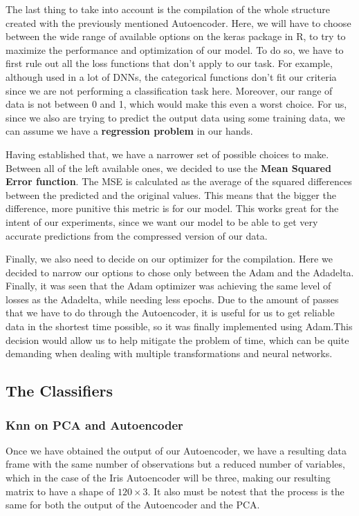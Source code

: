 The last thing to take into account is the compilation of the whole structure created with the previously mentioned Autoencoder. Here, we will have to choose between the wide range of available options on the keras package in R, to try to maximize the performance and optimization of our model. To do so, we have to first rule out all the loss functions that don't apply to our task. For example, although used in a lot of DNNs, the categorical functions don't fit our criteria since we are not performing a classification task here. Moreover, our range of data is not between 0 and 1, which would make this even a worst choice. For us, since we also are trying to predict the output data using some training data, we can assume we have a \textbf{regression problem} in our hands.\par

Having established that, we have a narrower set of possible choices to make. Between all of the left available ones, we decided to use the \textbf{Mean Squared Error function}. The MSE is calculated as the average of the squared differences between the predicted and the original values. This means that the bigger the difference,  more punitive this metric is for our model. This works great for the intent of our experiments, since we want our model to be able to get very accurate predictions from the compressed version of our data. \par

Finally, we also need to decide on our optimizer for the compilation. Here we decided to narrow our options to chose only between the Adam and the Adadelta. Finally, it was seen that the Adam optimizer was achieving the same level of losses as the Adadelta, while needing less epochs. Due to the amount of passes that we have to do through the Autoencoder, it is useful for us to get reliable data in the shortest time possible, so it was finally implemented using Adam.This decision would allow us to help mitigate the problem of time, which can be quite demanding when dealing with multiple transformations and neural networks.

\subsection{The Classifiers}

\subsubsection{Knn on PCA and Autoencoder}
Once we have obtained the output of our Autoencoder, we have a resulting data frame with the same number of observations but a reduced number of variables, which in the case of the Iris Autoencoder will be three, making our resulting matrix to have a shape of $120\times3$. It also must be notest that the process is the same for both the output of the Autoencoder and the PCA.\par

